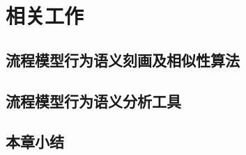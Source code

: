 \chapter{相关工作}\label{cha:related_work}

\section{流程模型行为语义刻画及相似性算法}\label{sec:related_algorithms}

\section{流程模型行为语义分析工具}\label{sec:related_tools}

\section{本章小结}